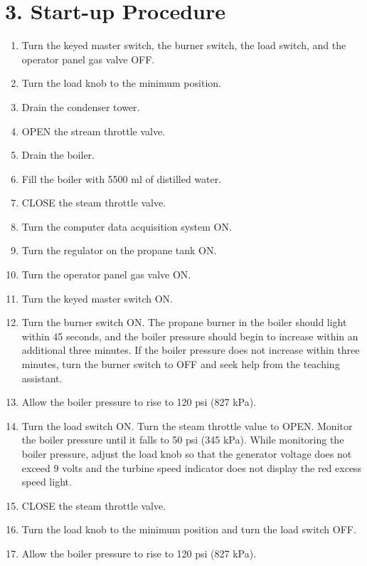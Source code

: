 \documentclass[12pt]{article}
\begin{document}
\section*{\normalsize \bf 3. Start-up Procedure}

\begin{enumerate}

\item Turn the keyed master switch, the burner switch, the load
switch, and the operator panel gas valve OFF.

\item Turn the load knob to the minimum position.

\item Drain the condenser tower.

\item OPEN the stream throttle valve.

\item Drain the boiler.

\item Fill the boiler with 5500 ml of distilled water.

\item CLOSE the steam throttle valve.

\item Turn the computer data acquisition system ON.

\item Turn the regulator on the propane tank ON.

\item Turn the operator panel gas valve ON.

\item Turn the keyed master switch ON.

\item Turn the burner switch ON.  The propane burner in the boiler 
should light within 45 seconds, and the boiler pressure should  
begin to increase within an additional three minutes.  If the
boiler pressure does not increase within three minutes, turn the burner
switch to OFF and seek help from the teaching assistant.

\item Allow the boiler pressure to rise to 120 psi (827 kPa).

\item Turn the load switch ON.  Turn the steam throttle value to
OPEN.  Monitor the boiler pressure until it falls to 50 psi (345 kPa). 
While monitoring the boiler pressure, adjust the load knob so
that the generator voltage does not exceed 9 volts and the 
turbine speed indicator does not display the red excess speed light.    

\item CLOSE the steam throttle valve.  

\item Turn the load knob to the minimum position and turn the
load switch OFF.

\item Allow the boiler pressure to rise to 120 psi (827 kPa).

\end{enumerate}
\end{document}
